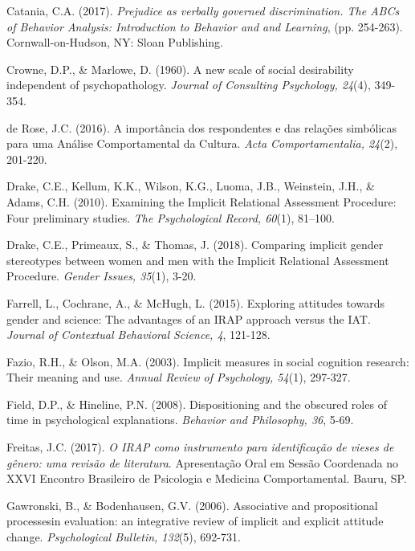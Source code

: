 \hangindent=25pt
\noindent Catania, C.A. (2017). \textit{Prejudice as verbally governed discrimination. The ABCs of Behavior Analysis: Introduction to Behavior and and Learning}, (pp. 254-263). Cornwall-on-Hudson, NY: Sloan Publi\-shing. 

\hangindent=25pt
\noindent Crowne, D.P., \& Marlowe, D. (1960). A new scale of social desirability independent of psychopathology. \textit{Journal of Consulting Psychology, 24}(4), 349-354.

\hangindent=25pt
\noindent de Rose, J.C. (2016). A importância dos respondentes e das relações simbólicas para uma Análise Comportamental da Cultura. \textit{Acta Comportamentalia, 24}(2), 201-220.

\hangindent=25pt
\noindent Drake, C.E., Kellum, K.K., Wilson, K.G., Luoma, J.B., Weinstein, J.H., \& Adams, C.H. (2010). Examining the Implicit Relational Assessment Procedure: Four preliminary studies. \textit{The Psychological Record, 60}(1), 81–100.

\hangindent=25pt
\noindent Drake, C.E., Primeaux, S., \& Thomas, J. (2018). Comparing implicit gender stereotypes between women and men with the Implicit Relational Assessment Procedure. \textit{Gender Issues, 35}(1), 3-20.

\hangindent=25pt
\noindent Farrell, L., Cochrane, A., \& McHugh, L. (2015). Exploring attitudes to\-wards gender and science: The advantages of an IRAP approach versus the IAT. \textit{Journal of Contextual Behavioral Science, 4}, 121-128.

\hangindent=25pt
\noindent Fazio, R.H., \& Olson, M.A. (2003). Implicit measures in social cognition research: Their meaning and use. \textit{Annual Review of Psychology, 54}(1), 297-327.

\hangindent=25pt
\noindent Field, D.P., \& Hineline, P.N. (2008). Dispositioning and the obscured roles of time in psychological explanations. \textit{Behavior and Philosophy, 36}, 5-69.

\hangindent=25pt
\noindent Freitas, J.C. (2017). \textit{O IRAP como instrumento para identificação de vieses de gênero: uma revisão de literatura}. Apresentação Oral em Sessão Coordenada no XXVI Encontro Brasileiro de Psicologia e Medicina Comportamental. Bauru, SP.

\hangindent=25pt
\noindent Gawronski, B., \& Bodenhausen, G.V. (2006). Associative and propositional processesin evaluation: an integrative review of implicit and explicit attitude change. \textit{Psychological Bulletin, 132}(5), 692-731.

